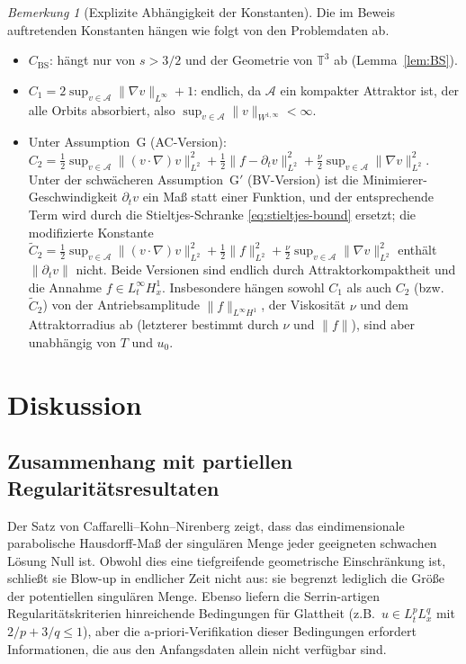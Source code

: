 \documentclass[12pt,a4paper]{article}
\theoremstyle{definition}
\theoremstyle{plain}
\theoremstyle{remark}
\newtheorem{remark}[definition]{Bemerkung}
\begin{document}
\begin{remark}[Explizite Abhängigkeit der Konstanten]
\label{rem:constants}
Die im Beweis auftretenden Konstanten hängen wie folgt von den Problemdaten ab.
\begin{itemize}
    \item $C_{\mathrm{BS}}$: hängt nur von $s > 3/2$ und der Geometrie von
          $\mathbb{T}^3$ ab (Lemma~\ref{lem:BS}).
    \item $C_1 = 2\sup_{v\in\mathcal{A}}\|\nabla v\|_{L^\infty} + 1$: endlich,
          da $\mathcal{A}$ ein kompakter Attraktor ist, der alle Orbits absorbiert,
          also $\sup_{v\in\mathcal{A}}\|v\|_{W^{1,\infty}} < \infty$.
    \item Unter Assumption~G (AC-Version):
          $C_2 = \tfrac12\sup_{v\in\mathcal{A}}\|(v\cdot\nabla)v\|_{L^2}^2
          + \tfrac12\|f - \partial_t v\|_{L^2}^2
          + \tfrac{\nu}{2}\sup_{v\in\mathcal{A}}\|\nabla v\|_{L^2}^2$.
          Unter der schwächeren Assumption~G$'$ (BV-Version) ist die
          Minimierer-Geschwindigkeit $\partial_t v$ ein Maß statt einer Funktion,
          und der entsprechende Term wird durch die Stieltjes-Schranke
          \eqref{eq:stieltjes-bound} ersetzt; die modifizierte Konstante
          $\widetilde{C}_2 = \tfrac12\sup_{v\in\mathcal{A}}\|(v\cdot\nabla)v\|_{L^2}^2
          + \tfrac12\|f\|_{L^2}^2 +
          \tfrac{\nu}{2}\sup_{v\in\mathcal{A}}\|\nabla v\|_{L^2}^2$
          enthält $\|\partial_t v\|$ nicht.
          Beide Versionen sind endlich durch Attraktorkompaktheit und die Annahme
          $f \in L^\infty_t H^1_x$. Insbesondere hängen sowohl $C_1$ als auch $C_2$
          (bzw.\ $\widetilde{C}_2$)
          von der Antriebsamplitude $\|f\|_{L^\infty H^1}$, der
          Viskosität $\nu$ und dem Attraktorradius ab (letzterer bestimmt durch
          $\nu$ und $\|f\|$), sind aber unabhängig von $T$ und $u_0$.
\end{itemize}
\end{remark}

\section{Diskussion}

\subsection{Zusammenhang mit partiellen Regularitätsresultaten}

Der Satz von Caffarelli--Kohn--Nirenberg \cite{CaffarelliKohnNirenberg1982} zeigt, dass das eindimensionale parabolische Hausdorff-Maß der singulären Menge jeder geeigneten schwachen Lösung Null ist. Obwohl dies eine tiefgreifende geometrische Einschränkung ist, schließt sie Blow-up in endlicher Zeit nicht aus: sie begrenzt lediglich die Größe der potentiellen singulären Menge. Ebenso liefern die Serrin-artigen Regularitätskriterien \cite{Leray1934,ConstantinFoias1988} hinreichende Bedingungen für Glattheit (z.B.\ $u \in L^p_t L^q_x$ mit $2/p + 3/q \le 1$), aber die a-priori-Verifikation dieser Bedingungen erfordert Informationen, die aus den Anfangsdaten allein nicht verfügbar sind.
\end{document}

